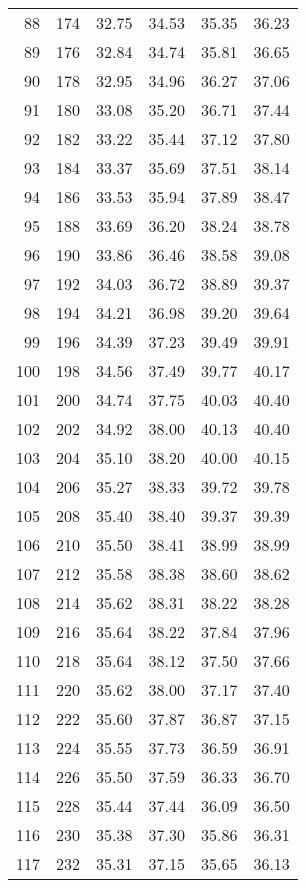 \begin{longtable}{rrllll}
		88 & 174 & 32.75 & 34.53 & 35.35 & 36.23 \\ 
		89 & 176 & 32.84 & 34.74 & 35.81 & 36.65 \\ 
		90 & 178 & 32.95 & 34.96 & 36.27 & 37.06 \\ 
		91 & 180 & 33.08 & 35.20 & 36.71 & 37.44 \\ 
		92 & 182 & 33.22 & 35.44 & 37.12 & 37.80 \\ 
		93 & 184 & 33.37 & 35.69 & 37.51 & 38.14 \\ 
		94 & 186 & 33.53 & 35.94 & 37.89 & 38.47 \\ 
		95 & 188 & 33.69 & 36.20 & 38.24 & 38.78 \\ 
		96 & 190 & 33.86 & 36.46 & 38.58 & 39.08 \\ 
		97 & 192 & 34.03 & 36.72 & 38.89 & 39.37 \\ 
		98 & 194 & 34.21 & 36.98 & 39.20 & 39.64 \\ 
		99 & 196 & 34.39 & 37.23 & 39.49 & 39.91 \\ 
		100 & 198 & 34.56 & 37.49 & 39.77 & 40.17 \\ 
		101 & 200 & 34.74 & 37.75 & 40.03 & 40.40 \\ 
		102 & 202 & 34.92 & 38.00 & 40.13 & 40.40 \\ 
		103 & 204 & 35.10 & 38.20 & 40.00 & 40.15 \\ 
		104 & 206 & 35.27 & 38.33 & 39.72 & 39.78 \\ 
		105 & 208 & 35.40 & 38.40 & 39.37 & 39.39 \\ 
		106 & 210 & 35.50 & 38.41 & 38.99 & 38.99 \\ 
		107 & 212 & 35.58 & 38.38 & 38.60 & 38.62 \\ 
		108 & 214 & 35.62 & 38.31 & 38.22 & 38.28 \\ 
		109 & 216 & 35.64 & 38.22 & 37.84 & 37.96 \\ 
		110 & 218 & 35.64 & 38.12 & 37.50 & 37.66 \\ 
		111 & 220 & 35.62 & 38.00 & 37.17 & 37.40 \\ 
		112 & 222 & 35.60 & 37.87 & 36.87 & 37.15 \\ 
		113 & 224 & 35.55 & 37.73 & 36.59 & 36.91 \\ 
		114 & 226 & 35.50 & 37.59 & 36.33 & 36.70 \\ 
		115 & 228 & 35.44 & 37.44 & 36.09 & 36.50 \\ 
		116 & 230 & 35.38 & 37.30 & 35.86 & 36.31 \\ 
		117 & 232 & 35.31 & 37.15 & 35.65 & 36.13 \\ 

\end{longtable}
